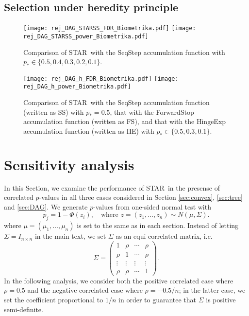 \documentclass{biometrika}
\renewcommand{\star}{STAR}
\newcommand{\pth}{p_{*}}
\newcommand{\lb}{\left(}
\newcommand{\rb}{\right)}
\newcommand{\1}{\mathbf{1}}
\begin{document}
\newpage
\subsection{Selection under heredity principle}\label{app:experiment_DAG}

\begin{figure}[h]
  \centering
  \texttt{[image: rej\_DAG\_STARSS\_FDR\_Biometrika.pdf]}
  \texttt{[image: rej\_DAG\_STARSS\_power\_Biometrika.pdf]}
  \caption{Comparison of \star ~with the SeqStep accumulation function with $\pth\in \{0.5, 0.4, 0.3, 0.2, 0.1\}$. }\label{fig:rej_DAG_STARSS}
\end{figure}

\begin{figure}[h]
  \centering
  \texttt{[image: rej\_DAG\_h\_FDR\_Biometrika.pdf]}
  \texttt{[image: rej\_DAG\_h\_power\_Biometrika.pdf]}
  \caption{Comparison of \star ~with the SeqStep accumulation function (written as SS) with $\pth = 0.5$, that with the ForwardStop accumulation function (written as FS), and that with the HingeExp accumulation function (written as HE) with $\pth\in \{0.5, 0.3, 0.1\}$.}\label{fig:rej_DAG_h}
\end{figure}

\newpage

\section{Sensitivity analysis}\label{sec:sensitivity}

In this Section, we examine the performance of \star ~in the presense of correlated $p$-values in all three cases considered in Section \ref{sec:convex}, \ref{sec:tree} and \ref{sec:DAG}. We generate $p$-values from one-sided normal test with 
\[p_{j} = 1 - \Phi(z_{i}), \quad \mbox{where }z = (z_{1}, \ldots, z_{n})\sim N(\mu, \Sigma).\]
where $\mu = (\mu_{1}, \ldots, \mu_{n})$ is set to the same as in each section. Instead of letting $\Sigma = I_{n\times n}$ in the main text, we set $\Sigma$ as an equi-correlated matrix, i.e.
\[\Sigma = \lb
  \begin{array}{cccc}
    1 & \rho & \cdots & \rho\\
    \rho & 1 & \cdots & \rho\\
    \vdots & \vdots & \vdots & \vdots\\
    \rho & \rho & \cdots & 1
  \end{array}
\rb.\]
In the following analysis, we consider both the positive correlated case where $\rho = 0.5$ and the negative correlated case where $\rho = -0.5 / n$; in the latter case, we set the coefficient proportional to $1/n$ in order to guarantee that $\Sigma$ is positive semi-definite. 
\end{document}
